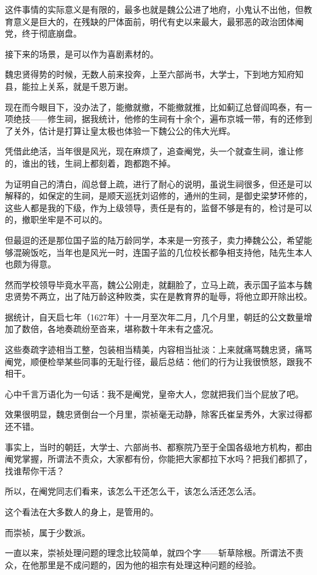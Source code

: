 \begin{multicols}{\theparacolNo}
		这件事情的实际意义是有限的，最多也就是魏公公进了地府，小鬼认不出他，但教育意义是巨大的，在残缺的尸体面前，明代有史以来最大，最邪恶的政治团体阉党，终于彻底崩盘。

		接下来的场景，是可以作为喜剧素材的。

		魏忠贤得势的时候，无数人前来投奔，上至六部尚书，大学士，下到地方知府知县，能拉上关系，就是千恩万谢。

		现在而今眼目下，没办法了，能撤就撤，不能撤就推，比如蓟辽总督阎鸣泰，有一项绝技——修生祠，据我统计，他修的生祠有十余个，遍布京城一带，有的还修到了关外，估计是打算让皇太极也体验一下魏公公的伟大光辉。

		凭借此绝活，当年很是风光，现在麻烦了，追查阉党，头一个就查生祠，谁让修的，谁出的钱，生祠上都刻着，跑都跑不掉。

		为证明自己的清白，阎总督上疏，进行了耐心的说明，虽说生祠很多，但还是可以解释的，如保定的生祠，是顺天巡抚刘诏修的，通州的生祠，是御史梁梦环修的，这些人都是我的下级，作为上级领导，责任是有的，监督不够是有的，检讨是可以的，撤职坐牢是不可以的。

		但最逗的还是那位国子监的陆万龄同学，本来是一穷孩子，卖力捧魏公公，希望能够混碗饭吃，当年也是风光一时，连国子监的几位校长都争相支持他，陆先生本人也颇为得意。

		然而学校领导毕竟水平高，魏公公刚走，就翻脸了，立马上疏，表示国子监本与魏忠贤势不两立，出了陆万龄这种败类，实在是教育界的耻辱，将他立即开除出校。

		据统计，自天启七年（1627年）十一月至次年二月，几个月里，朝廷的公文数量增加了数倍，各地奏疏纷至沓来，堪称数十年未有之盛况。

		这些奏疏字迹相当工整，包装相当精美，内容相当扯淡：上来就痛骂魏忠贤，痛骂阉党，顺便检举某些同事的无耻行径，最后总结：他们的行为让我很愤怒，跟我不相干。

		心中千言万语化为一句话：我不是阉党，皇帝大人，您就把我们当个屁放了吧。

		效果很明显，魏忠贤倒台一个月里，崇祯毫无动静，除客氏崔呈秀外，大家过得都还不错。

		事实上，当时的朝廷，大学士、六部尚书、都察院乃至于全国各级地方机构，都由阉党掌握，所谓法不责众，大家都有份，你能把大家都拉下水吗？把我们都抓了，找谁帮你干活？

		所以，在阉党同志们看来，该怎么干还怎么干，该怎么活还怎么活。

		这个看法在大多数人的身上，是管用的。

		而崇祯，属于少数派。

		一直以来，崇祯处理问题的理念比较简单，就四个字——斩草除根。所谓法不责众，在他那里是不成问题的，因为他的祖宗有处理这种问题的经验。


\end{multicols}
